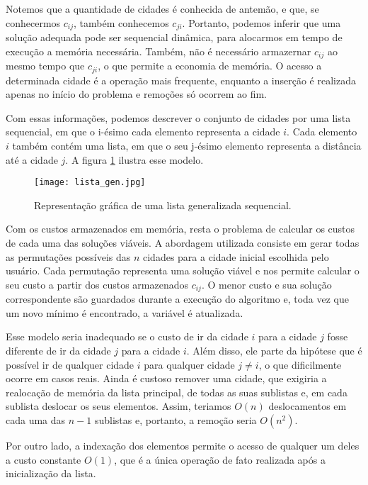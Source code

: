 \documentclass[a4paper, 12pt]{article} %
\begin{document}
	Notemos que a quantidade de cidades é conhecida de antemão, e que, se conhecermos $c_{ij}$, também conhecemos $c_{ji}$. Portanto, podemos inferir que uma solução adequada pode ser sequencial dinâmica, para alocarmos em tempo de execução a memória necessária. Também, não é necessário armazernar $c_{ij}$ ao mesmo tempo que $c_{ji}$, o que permite a economia de memória. O acesso a determinada cidade é a operação mais frequente, enquanto a inserção é realizada apenas no início do problema e remoções só ocorrem ao fim.
	
	Com essas informações, podemos descrever o conjunto de cidades por uma lista sequencial, em que o i-ésimo cada elemento representa a cidade $i$. Cada elemento $i$ também contém uma lista, em que o seu j-ésimo elemento representa a distância até a cidade $j$. A figura \ref{lista_gen} ilustra esse modelo.
	
	\begin{figure}[!h]
		\centering
		\texttt{[image: lista\_gen.jpg]}
		\caption{Representação gráfica de uma lista generalizada sequencial.}
		\label{lista_gen}
	\end{figure}
	
	Com os custos armazenados em memória, resta o problema de calcular os custos de cada uma das soluções viáveis. A abordagem utilizada consiste em gerar todas as permutações possíveis das $n$ cidades para a cidade inicial escolhida pelo usuário. Cada permutação representa uma solução viável e nos permite calcular o seu custo a partir dos custos armazenados $c_{ij}$. O menor custo e sua solução correspondente são guardados durante a execução do algoritmo e, toda vez que um novo mínimo é encontrado, a variável é atualizada.
	
	Esse modelo seria inadequado se o custo de ir da cidade $i$ para a cidade $j$ fosse diferente de ir da cidade $j$ para a cidade $i$. Além disso, ele parte da hipótese que é possível ir de qualquer cidade $i$ para qualquer cidade $j \neq i$, o que dificilmente ocorre em casos reais. Ainda é custoso remover uma cidade, que exigiria a realocação de memória da lista principal, de todas as suas sublistas e, em cada sublista deslocar os seus elementos. Assim, teriamos $O(n)$ deslocamentos em cada uma das $n - 1$ sublistas e, portanto, a remoção seria $O(n^2)$.
	
	Por outro lado, a indexação dos elementos permite o acesso de qualquer um deles a custo constante $O(1)$, que é a única operação de fato realizada após a inicialização da lista. 
\end{document}
